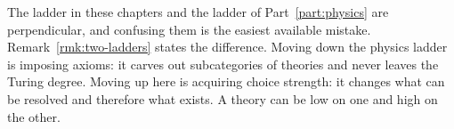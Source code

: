 \begin{remark}
\label{rmk:ladders-again}
The ladder in these chapters and the ladder of Part~\ref{part:physics}
are perpendicular, and confusing them is the easiest available mistake.
Remark~\ref{rmk:two-ladders} states the difference.
Moving down the physics ladder is imposing axioms: it carves out
subcategories of theories and never leaves the Turing degree.
Moving up here is acquiring choice strength: it changes what can be
resolved and therefore what exists.
A theory can be low on one and high on the other.
\end{remark}

